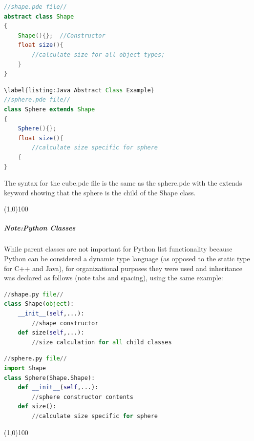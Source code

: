 \singlespacing
\begin{lstlisting}[language=Java, style=mystyle]
//shape.pde file//
abstract class Shape
{
    Shape(){};  //Constructor
    float size(){
        //calculate size for all object types;
    }
}
\end{lstlisting}
\begin{lstlisting}[language=Java, caption=Java Abstract Class Example, style=mystyle]
\label{listing:Java Abstract Class Example}
//sphere.pde file//
class Sphere extends Shape
{
    Sphere(){};
    float size(){
        //calculate size specific for sphere
    {
}
\end{lstlisting}
\doublespacing
The syntax for the cube.pde file is the same as the sphere.pde with the extends keyword showing that the sphere is the child of the Shape class.
\begin{center}
\line(1,0){100}
\end{center}
\subparagraph{Note:Python Classes}
While parent classes are not important for Python list functionality because Python can be considered a dynamic type language (as opposed to the static type for C++ and Java), for organizational purposes they were used and inheritance was declared as follows (note tabs and spacing), using the same example:
\singlespacing
\begin{lstlisting}[language=Python, style=mystyle]
//shape.py file//
class Shape(object):
    __init__(self,...):
        //shape constructor
    def size(self,...):
        //size calculation for all child classes
\end{lstlisting}
\begin{lstlisting}[language=Python, caption=Python Class Inheritance Example, style=mystyle]
//sphere.py file//
import Shape
class Sphere(Shape.Shape):
    def __init__(self,...):
        //sphere constructor contents
    def size():
        //calculate size specific for sphere
\end{lstlisting}
\begin{center}
\line(1,0){100}
\end{center}
\doublespacing
